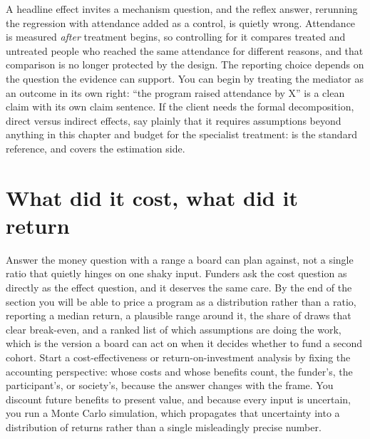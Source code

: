 \documentclass[
    a4paper,
    fontsize=10pt,
    twoside=true,
    numbers=noenddot,
]{kaobook}
\begin{document}
\begin{kaobox}[frametitle=When the next question is \enquote{did it work \emph{through} attendance?}]
A headline effect invites a mechanism question, and the reflex answer, rerunning the regression with attendance added as a control, is quietly wrong. Attendance is measured \emph{after} treatment begins, so controlling for it compares treated and untreated people who reached the same attendance for different reasons, and that comparison is no longer protected by the design. The reporting choice depends on the question the evidence can support. You can begin by treating the mediator as an outcome in its own right: \enquote{the program raised attendance by X} is a clean claim with its own claim sentence. If the client needs the formal decomposition, direct versus indirect effects, say plainly that it requires assumptions beyond anything in this chapter and budget for the specialist treatment: \textcite{vanderweele2015explanation} is the standard reference, and \textcite{huber2023causal} covers the estimation side.
\end{kaobox}

\section{What did it cost, what did it return}\label{sec:roi}
Answer the money question with a range a board can plan against, not a single ratio that quietly hinges on one shaky input. Funders ask the cost question as directly as the effect question, and it deserves the same care. By the end of the section you will be able to price a program as a distribution rather than a ratio, reporting a median return, a plausible range around it, the share of draws that clear break-even, and a ranked list of which assumptions are doing the work, which is the version a board can act on when it decides whether to fund a second cohort. Start a cost-effectiveness or return-on-investment analysis by fixing the accounting perspective: whose costs and whose benefits count, the funder's, the participant's, or society's, because the answer changes with the frame. You discount future benefits to present value, and because every input is uncertain, you run a Monte Carlo simulation, which propagates that uncertainty into a distribution of returns rather than a single misleadingly precise number.
\end{document}
